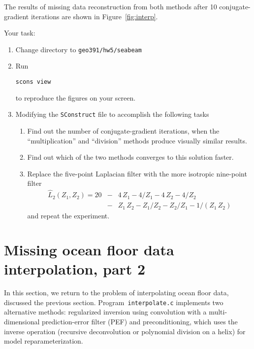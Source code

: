 The results of missing data reconstruction from both methods after 10 conjugate-gradient iterations are shown in Figure~\ref{fig:interp}.


Your task:
\begin{enumerate}
\item Change directory to \verb#geo391/hw5/seabeam#
\item Run 
\begin{verbatim}
scons view
\end{verbatim}
to reproduce the figures on your screen.
\item Modifying the \texttt{SConstruct} file to accomplish the following tasks
\begin{enumerate}
\item Find out the number of conjugate-gradient iterations, when the ``multiplication'' and ``division'' methods produce visually similar results.
\item Find out which of the two methods converges to this solution faster.
\item Replace the five-point Laplacian filter with the more isotropic nine-point filter 
\begin{eqnarray}
\nonumber
\hat{L}_2(Z_1,Z_2) = 20 & - & 4\,Z_1 - 4/Z_1 - 4\,Z_2 - 4/Z_2 \\
& - & Z_1\,Z_2 - Z_1/Z_2 - Z_2/Z_1 - 1/(Z_1\,Z_2)
\label{eq:lap9}
\end{eqnarray}
and repeat the experiment.
\end{enumerate}
\end{enumerate}

\lstset{language=python,numbers=left,numberstyle=\tiny,showstringspaces=false}


\section{Missing ocean floor data interpolation, part 2}

In this section, we return to the problem of interpolating ocean floor
data, discussed the previous section. Program~\texttt{interpolate.c}
implements two alternative methods: regularized inversion using
convolution with a multi-dimensional prediction-error filter (PEF) and
preconditioning, which uses the inverse operation (recursive
deconvolution or polynomial division on a helix) for model
reparameterization.

